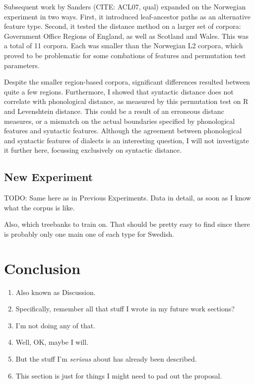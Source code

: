 \documentclass[11pt]{article}
\begin{document}
Subsequent work by Sanders (CITE: ACL07, qual) expanded on the
Norwegian experiment in two ways. First, it introduced leaf-ancestor
paths as an alternative feature type. Second, it tested the distance
method on a larger set of corpora: Government Office Regions of
England, as well as Scotland and Wales. This was a total of 11
corpora. Each was smaller than the Norwegian L2 corpora, which proved
to be problematic for some combations of features and permutation test
parameters.

Despite the smaller region-based corpora, significant differences
resulted between quite a few regions. Furthermore, I showed that
syntactic distance does not correlate with phonological distance, as
measured by this permutation test on R and Levenshtein distance. This
could be a result of an erroneous distanc measures, or a mismatch on
the actual boundaries specified by phonological features and syntactic
features. Although the agreement between phonological and syntactic
features of dialects is an interesting question, I will not
investigate it further here, focussing exclusively on syntactic
distance.

\subsection{New Experiment}

TODO: Same here as in Previous Experiments. Data in detail, as soon as
I know what the corpus is like.

Also, which treebanks to train on. That should be pretty easy to find
since there is probably only one main one of each type for Swedish.

\section{Conclusion}
\begin{enumerate}
\item Also known as Discussion.
\item Specifically, remember all that stuff I wrote in my future work sections?
\item I'm not doing any of that.
\item Well, OK, maybe I will.
\item But the stuff I'm {\it serious} about has already been described.
\item This section is just for things I might need to pad out the
  proposal.
\end{enumerate}
\end{document}
